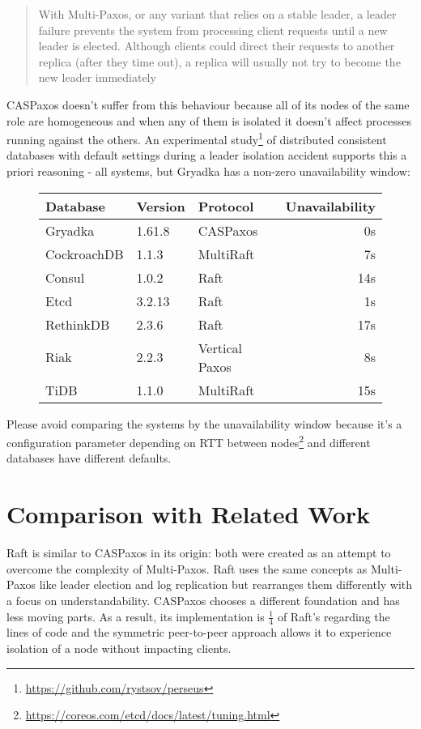 \documentclass[12pt]{article}
\theoremstyle{definition}
\begin{document}
\begin{quote}
  With Multi-Paxos, or any variant that relies on a stable leader, a leader failure prevents the system from processing client requests until a new leader is elected. Although clients could direct their requests to another replica (after they time out), a replica will usually not try to become the new leader immediately
\end{quote}

CASPaxos doesn't suffer from this behaviour because all of its nodes of the same role are homogeneous and when any of them is isolated it doesn't affect processes running against the others. An experimental study\footnote{\href{https://github.com/rystsov/perseus}{https://github.com/rystsov/perseus}} of distributed consistent databases with default settings during a leader isolation accident supports this a priori reasoning - all systems, but Gryadka has a non-zero unavailability window:

\begin{figure}[!h]
  \centering
  \begin{tabular}{|l|l|l|r|}
  \hline
  Database & Version & Protocol & Unavailability\\
  \hline
  \hline
  Gryadka & 1.61.8 & CASPaxos & 0s\\
  \hline
  CockroachDB & 1.1.3 & MultiRaft & 7s\\
  Consul & 1.0.2 & Raft & 14s\\
  Etcd & 3.2.13 & Raft & 1s\\
  RethinkDB & 2.3.6 & Raft & 17s\\
  Riak & 2.2.3 & Vertical Paxos & 8s\\
  TiDB & 1.1.0 & MultiRaft & 15s\\
  \hline
  \end{tabular}
\end{figure}

Please avoid comparing the systems by the unavailability window because it's a configuration parameter depending on RTT between nodes\footnote{\href{https://coreos.com/etcd/docs/latest/tuning.html}{https://coreos.com/etcd/docs/latest/tuning.html}} and different databases have different defaults.

\section{Comparison with Related Work}

Raft\cite{raft} is similar to CASPaxos in its origin: both were created as an attempt to overcome the complexity of Multi-Paxos. Raft uses the same concepts as Multi-Paxos like leader election and log replication but rearranges them differently with a focus on understandability. CASPaxos chooses a different foundation and has less moving parts. As a result, its implementation is $\frac{1}{4}$ of Raft's regarding the lines of code and the symmetric peer-to-peer approach allows it to experience isolation of a node without impacting clients.
\end{document}
